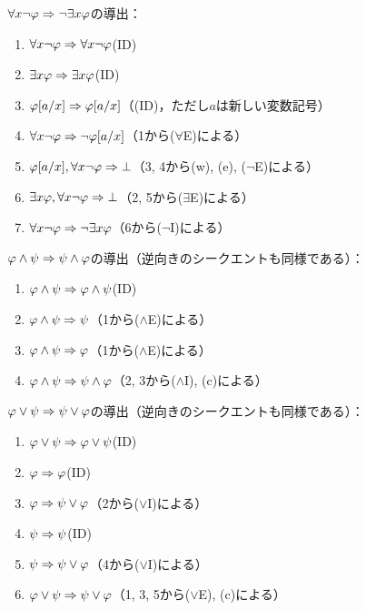 \(\forall x \lnot \varphi \Rightarrow \lnot \exists x \varphi\)の導出：
\begin{enumerate}
	\item \(\forall x \lnot \varphi \Rightarrow \forall x \lnot \varphi\)\quad (ID)
	\item \(\exists x \varphi \Rightarrow \exists x \varphi\)\quad (ID)
	\item \(\subst{\varphi}{a/x} \sequent \subst{\varphi}{a/x}\)\quad （(ID)，ただし\(a\)は新しい変数記号）
	\item \(\forall x \lnot \varphi \sequent \lnot \subst{\varphi}{a/x}\)\quad （1から(\(\forall\)E)による）
	\item \(\subst{\varphi}{a/x}, \forall x \lnot \varphi \sequent \bot\)\quad （3, 4から(w), (e), (\(\lnot\)E)による）
	\item \(\exists x \varphi, \forall x \lnot \varphi \Rightarrow \bot\)\quad （2, 5から(\(\exists\)E)による）
	\item \(\forall x \lnot \varphi \Rightarrow \lnot \exists x \varphi\)\quad （6から(\(\lnot\)I)による）
\end{enumerate}

\(\varphi \land \psi \Rightarrow \psi \land \varphi\)の導出（逆向きのシークエントも同様である）：
\begin{enumerate}
	\item \(\varphi \land \psi \Rightarrow \varphi \land \psi\)\quad (ID)
	\item \(\varphi \land \psi \Rightarrow \psi\)\quad （1から(\(\land\)E)による）
	\item \(\varphi \land \psi \Rightarrow \varphi\)\quad （1から(\(\land\)E)による）
	\item \(\varphi \land \psi \Rightarrow \psi \land \varphi\)\quad （2, 3から(\(\land\)I), (c)による）
\end{enumerate}

\(\varphi \lor \psi \Rightarrow \psi \lor \varphi\)の導出（逆向きのシークエントも同様である）：
\begin{enumerate}
	\item \(\varphi \lor \psi \Rightarrow \varphi \lor \psi\)\quad (ID)
	\item \(\varphi \Rightarrow \varphi\)\quad (ID)
	\item \(\varphi \Rightarrow \psi \lor \varphi\)\quad （2から(\(\lor\)I)による）
	\item \(\psi \Rightarrow \psi\)\quad (ID)
	\item \(\psi \Rightarrow \psi \lor \varphi\)\quad （4から(\(\lor\)I)による）
	\item \(\varphi \lor \psi \Rightarrow \psi \lor \varphi\)\quad （1, 3, 5から(\(\lor\)E), (c)による）
\end{enumerate}

